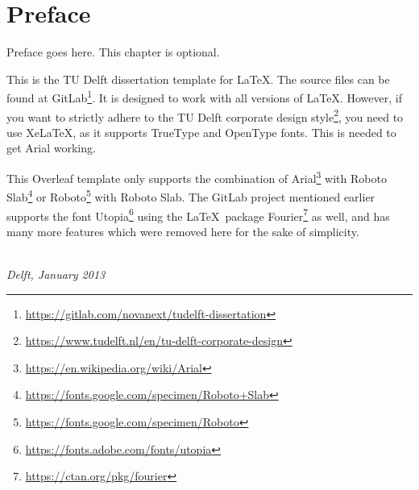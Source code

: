 \chapter{Preface}

Preface goes here. This chapter is optional.

This is the TU Delft dissertation template for LaTeX. The source files can be found at GitLab\footnote{\url{https://gitlab.com/novanext/tudelft-dissertation}}. It is designed to work with all versions of LaTeX.
However, if you want to strictly adhere to the TU Delft corporate design style\footnote{\url{https://www.tudelft.nl/en/tu-delft-corporate-design}}, you need to use XeLaTeX, as it supports TrueType and OpenType fonts.
This is needed to get Arial working.

This Overleaf template only supports the combination of Arial\footnote{\url{https://en.wikipedia.org/wiki/Arial}} with Roboto Slab\footnote{\url{https://fonts.google.com/specimen/Roboto+Slab}
} or Roboto\footnote{\url{https://fonts.google.com/specimen/Roboto}} with Roboto Slab. The GitLab project mentioned earlier supports the font Utopia\footnote{\url{https://fonts.adobe.com/fonts/utopia}} using the \LaTeX\ package Fourier\footnote{\url{https://ctan.org/pkg/fourier}} as well, and has many more features which were removed here for the sake of simplicity.

\begin{flushright}
{\makeatletter\itshape
    \@firstnames\ \@lastname \\
    Delft, January 2013
\makeatother}
\end{flushright}

